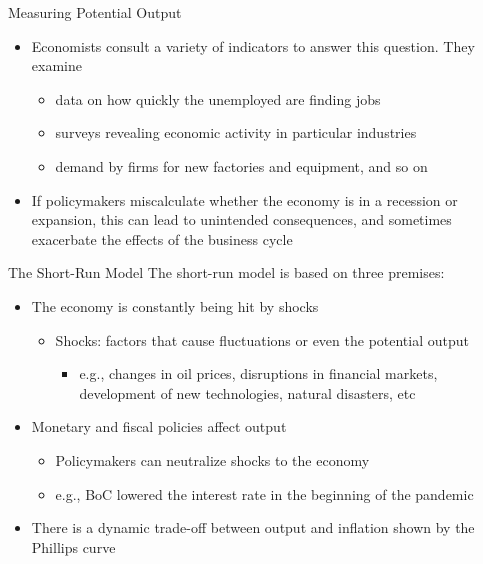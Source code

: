 \documentclass[aspectratio=1610]{beamer}
\begin{document}
\begin{frame}[wide]{Measuring Potential Output}
	\begin{itemize}
		\item Economists consult a variety of indicators to answer this question. They examine
		\begin{itemize}
			\item data on how quickly the unemployed are finding jobs
			\item surveys revealing economic activity in particular industries
			\item demand by firms for new factories and equipment, and so on
		\end{itemize}
		\item If policymakers miscalculate whether the economy is in a recession or expansion, this can lead to unintended consequences, and sometimes exacerbate the effects of the business cycle
	\end{itemize}
\end{frame}



\begin{frame}[wide]{The Short-Run Model}
	The short-run model is based on three premises:
	\vspace{1mm}
	\begin{itemize}
		\item 	The economy is constantly being hit by shocks
		\vspace{1mm}
		\begin{itemize}
			\item Shocks: factors that cause fluctuations or even the potential output
			\begin{itemize}
				\item e.g., changes in oil prices, disruptions in financial markets, development of new technologies, natural disasters, etc
			\end{itemize}
		\end{itemize}
		\item Monetary and fiscal policies affect output
		\vspace{1mm}
		\begin{itemize}
			\item Policymakers can neutralize shocks to the economy
			\item e.g., BoC lowered the interest rate in the beginning of the pandemic 
		\end{itemize}
		\item There is a dynamic trade-off between output and inflation shown by the Phillips curve
	\end{itemize}
\end{frame}
\end{document}
